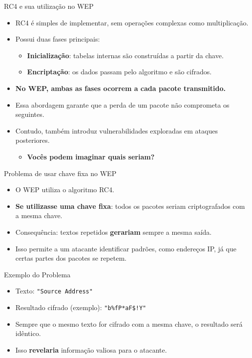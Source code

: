 \begin{frame}{RC4 e sua utilização no WEP}
    \begin{itemize}
        \item RC4 é simples de implementar, sem operações complexas como multiplicação.
        \item Possui duas fases principais:
              \begin{itemize}
                  \item \textbf{Inicialização}: tabelas internas são construídas a partir da chave.
                  \item \textbf{Encriptação}: os dados passam pelo algoritmo e são cifrados.
              \end{itemize}
        \item \textbf{No WEP, ambas as fases ocorrem a cada pacote transmitido.}
        \item Essa abordagem garante que a perda de um pacote não comprometa os seguintes.
        \item Contudo, também introduz vulnerabilidades exploradas em ataques posteriores.
              \begin{itemize}
                  \item \textbf{Vocês podem imaginar quais seriam?}
              \end{itemize}
    \end{itemize}
\end{frame}


\begin{frame}{Problema de usar chave fixa no WEP}
    \begin{itemize}
        \item O WEP utiliza o algoritmo RC4.
        \item \textbf{Se utilizasse uma chave fixa}: todos os pacotes seriam criptografados com a mesma chave.
        \item Consequência: textos repetidos \textbf{gerariam} sempre a mesma saída.
        \item Isso permite a um atacante identificar padrões, como endereços IP,
              já que certas partes dos pacotes se repetem.
    \end{itemize}

    \begin{block}{Exemplo do Problema}
        \begin{itemize}
            \item Texto: \texttt{"Source Address"}
            \item Resultado cifrado (exemplo): \texttt{"b\%fP*aF\$!Y"}
            \item Sempre que o mesmo texto for cifrado com a mesma chave, o resultado será idêntico.
            \item Isso \textbf{revelaria} informação valiosa para o atacante.
        \end{itemize}
    \end{block}
\end{frame}

